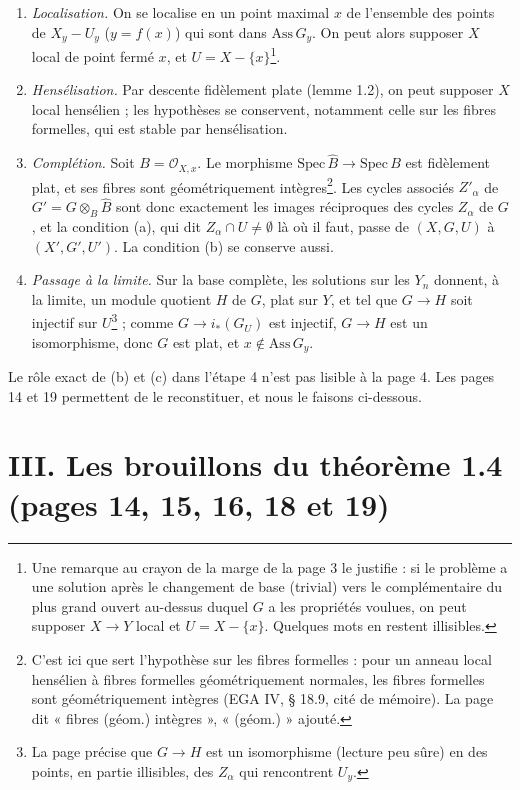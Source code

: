\documentclass[11pt,a4paper]{article}
\begin{document}
\begin{enumerate}
  \item \emph{Localisation.} On se localise en un point maximal $x$ de
  l'ensemble des points de $X_y - U_y$ ($y = f(x)$) qui sont dans
  $\mathrm{Ass}\, G_y$. On peut alors supposer $X$ local de point fermé $x$, et
  $U = X - \{x\}$\footnote{Une remarque au crayon de la marge de la page 3
  le justifie : si le problème a une solution après le changement de base
  (trivial) vers le complémentaire du plus grand ouvert au-dessus duquel $G$ a
  les propriétés voulues, on peut supposer $X \to Y$ local et $U = X -
  \{x\}$. Quelques mots en restent illisibles.}.
  \item \emph{Hensélisation.} Par descente fidèlement plate (lemme 1.2), on
  peut supposer $X$ local hensélien ; les hypothèses se conservent, notamment
  celle sur les fibres formelles, qui est stable par hensélisation.
  \item \emph{Complétion.} Soit $B = \mathcal{O}_{X,x}$. Le morphisme
  $\mathrm{Spec}\, \widehat{B} \to \mathrm{Spec}\, B$ est fidèlement plat, et
  ses fibres sont géométriquement intègres\footnote{C'est ici que sert
  l'hypothèse sur les fibres formelles : pour un anneau local hensélien à fibres
  formelles géométriquement normales, les fibres formelles sont
  géométriquement intègres (EGA IV, § 18.9, cité de mémoire). La page dit
  « fibres (géom.) intègres », « (géom.) » ajouté.}. Les cycles associés
  $Z'_\alpha$ de $G' = G \otimes_B \widehat{B}$ sont donc exactement les
  images réciproques des cycles $Z_\alpha$ de $G$, et la condition (a), qui
  dit $Z_\alpha \cap U \neq \emptyset$ là où il faut, passe de $(X, G, U)$ à
  $(X', G', U')$. La condition (b) se conserve aussi.
  \item \emph{Passage à la limite.} Sur la base complète, les solutions sur
  les $Y_n$ donnent, à la limite, un module quotient $H$ de $G$, plat sur $Y$,
  et tel que $G \to H$ soit injectif sur $U$\footnote{La page précise que
  $G \to H$ est un isomorphisme (lecture peu sûre) en des points, en partie
  illisibles, des $Z_\alpha$ qui rencontrent $U_y$.} ; comme $G \to i_*(G_U)$ est
  injectif, $G \to H$ est un isomorphisme, donc $G$ est plat, et $x \notin
  \mathrm{Ass}\, G_y$.
\end{enumerate}

Le rôle exact de (b) et (c) dans l'étape 4 n'est pas lisible à la page 4. Les
pages 14 et 19 permettent de le reconstituer, et nous le faisons ci-dessous.

\section*{III. Les brouillons du théorème 1.4 (pages 14, 15, 16, 18 et 19)}
\end{document}
